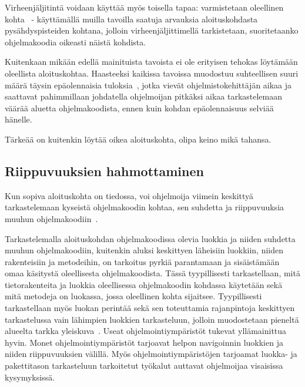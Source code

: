 \documentclass[finnish]{../tktltiki2}
\theoremstyle{definition}
\theoremstyle{remark}
\begin{document}
Virheenjäljitintä voidaan käyttää myös toisella tapaa: varmistetaan oleellinen kohta~\cite{eliciting-design-requirements-for-maintenance-oriented-ides} - käyttämällä muilla tavoilla saatuja arvauksia aloituskohdasta pysähdyspisteiden kohtana, jolloin virheenjäljittimellä tarkistetaan, suoritetaanko ohjelmakoodia oikeasti näistä kohdista.

Kuitenkaan mikään edellä mainituista tavoista ei ole erityisen tehokas löytämään oleellista aloituskohtaa. Haasteeksi kaikissa tavoissa muodostuu suhteellisen suuri määrä täysin epäolennaisia tuloksia~\cite{eliciting-design-requirements-for-maintenanoiece-oriented-ides}, jotka vievät ohjelmistokehittäjän aikaa ja saattavat pahimmillaan johdatella ohjelmoijan pitkäksi aikaa tarkastelemaan väärää aluetta ohjelmakoodista, ennen kuin kohdan epäolennaisuus selviää hänelle.

Tärkeää on kuitenkin löytää oikea aloituskohta, olipa keino mikä tahansa.

\subsection{Riippuvuuksien hahmottaminen}
Kun sopiva aloituskohta on tiedossa, voi ohjelmoija viimein keskittyä tarkastelemaan kyseistä ohjelmakoodin kohtaa, sen suhdetta ja riippuvuuksia muuhun ohjelmakoodiin~\cite{questions-during-software-evolution-tasks}.

Tarkastelemalla aloituskohdan ohjelmakoodissa olevia luokkia ja niiden suhdetta muuhun ohjelmakoodiin, kuitenkin aluksi keskittyen läheisiin luokkiin, niiden rakenteisiin ja metodeihin, on tarkoitus pyrkiä parantamaan ja sisäistämään omaa käsitystä oleellisesta ohjelmakoodista. Tässä tyypillisesti tarkastellaan, mitä tietorakenteita ja luokkia oleellisessa ohjelmakoodin kohdassa käytetään sekä mitä metodeja on luokassa, jossa oleellinen kohta sijaitsee. Tyypillisesti tarkastellaan myös luokan perintää sekä sen toteuttamia rajanpintoja keskittyen
tarkastelussa vain lähimpien luokkien tarkasteluun, jolloin muodostetaan pieneltä alueelta tarkka yleiskuva~\cite{questions-during-software-evolution-tasks}.
Useat ohjelmointiympäristöt tukevat yllämainittua hyvin. Monet ohjelmointiympäristöt tarjoavat helpon navigoinnin luokkien ja niiden riippuvuuksien välillä. Myös ohjelmointiympäristöjen tarjoamat luokka- ja pakettitason tarkasteluun tarkoitetut työkalut auttavat ohjelmoijaa visaisissa kysymyksissä.
\end{document}
